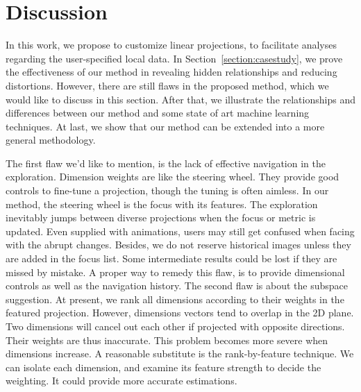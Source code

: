 \section{Discussion}
\label{section:discussion}
In this work, we propose to customize linear projections, to facilitate analyses regarding the user-specified local data. In Section~\ref{section:casestudy}, we prove the effectiveness of our method in revealing hidden relationships and reducing distortions. However, there are still flaws in the proposed method, which we would like to discuss in this section. After that, we illustrate the relationships and differences between our method and some state of art machine learning techniques. At last, we show that our method can be extended into a more general methodology.

The first flaw we'd like to mention, is the lack of effective navigation in the exploration. Dimension weights are like the steering wheel. They provide good controls to fine-tune a projection, though the tuning is often aimless. In our method, the steering wheel is the focus with its features. The exploration inevitably jumps between diverse projections when the focus or metric is updated. Even supplied with animations, users may still get confused when facing with the abrupt changes. Besides, we do not reserve historical images unless they are added in the focus list. Some intermediate results could be lost if they are missed by mistake. A proper way to remedy this flaw, is to provide dimensional controls as well as the navigation history. The second flaw is about the subspace suggestion. At present, we rank all dimensions according to their weights in the featured projection. However, dimensions vectors tend to overlap in the 2D plane. Two dimensions will cancel out each other if projected with opposite directions. Their weights are thus inaccurate. This problem becomes more severe when dimensions increase. A reasonable substitute is the rank-by-feature technique. We can isolate each dimension, and examine its feature strength to decide the weighting. It could provide more accurate estimations.

